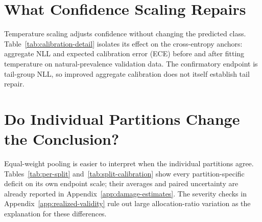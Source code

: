 \section{What Confidence Scaling Repairs}
\label{app:calibration}
Temperature scaling adjusts confidence without changing the predicted class. Table~\ref{tab:calibration-detail} isolates its effect on the cross-entropy anchors: aggregate NLL and expected calibration error (ECE) before and after fitting temperature on natural-prevalence validation data. The confirmatory endpoint is tail-group NLL, so improved aggregate calibration does not itself establish tail repair.

\begin{table}[H]
\centering\footnotesize\setlength{\tabcolsep}{3pt}

\caption{Cross-entropy aggregate NLL and ECE before and after temperature scaling. These are descriptive point estimates; confirmatory raw tail-group comparisons retain their paired uncertainty in Appendix~\ref{app:recovery-estimates}.}
\label{tab:calibration-detail}
\end{table}



\clearpage
\section{Do Individual Partitions Change the Conclusion?}
\label{app:splits}
Equal-weight pooling is easier to interpret when the individual partitions agree. Tables~\ref{tab:per-split} and~\ref{tab:split-calibration} show every partition-specific deficit on its own endpoint scale; their averages and paired uncertainty are already reported in Appendix~\ref{app:damage-estimates}. The severity checks in Appendix~\ref{app:realized-validity} rule out large allocation-ratio variation as the explanation for these differences.

\begin{table}[H]
\centering\small\setlength{\tabcolsep}{4pt}

\caption{Balanced-accuracy deficit by partition, in percentage points. Positive means damage. Partitions 1--3 correspond to stored partition identifiers 0--2.}
\label{tab:per-split}
\end{table}
\begin{table}[H]
\centering\small\setlength{\tabcolsep}{4pt}

\caption{Tail-group NLL deficit by partition, in nats. Negative values mean improved probability quality. These partition estimates do not replace pooled patient-bootstrap inference.}
\label{tab:split-calibration}
\end{table}

